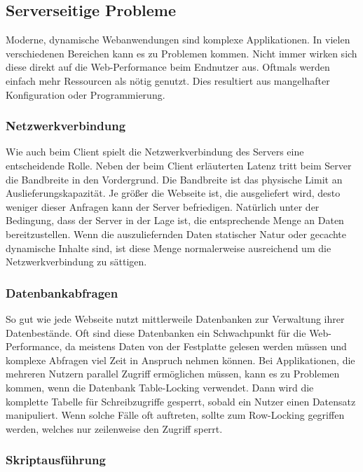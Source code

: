 \subsection{Serverseitige Probleme}
Moderne, dynamische Webanwendungen sind komplexe Applikationen. In vielen verschiedenen Bereichen kann es zu Problemen kommen. Nicht immer wirken sich diese direkt auf die Web-Performance beim Endnutzer aus. Oftmals werden einfach mehr Ressourcen als n\"otig genutzt. Dies resultiert aus mangelhafter Konfiguration oder Programmierung. 

\subsubsection{Netzwerkverbindung}
Wie auch beim Client spielt die Netzwerkverbindung des Servers eine entscheidende Rolle. Neben der beim Client erl\"auterten Latenz tritt beim Server die Bandbreite in den Vordergrund. Die Bandbreite ist das physische Limit an Auslieferungskapazität. Je gr\"o\ss{}er die Webseite ist, die ausgeliefert wird, desto weniger dieser Anfragen kann der Server befriedigen. Nat\"urlich unter der Bedingung, dass der Server in der Lage ist, die entsprechende Menge an Daten bereitzustellen. Wenn die auszuliefernden Daten statischer Natur oder gecachte dynamische Inhalte sind, ist diese Menge normalerweise ausreichend um die Netzwerkverbindung zu s\"attigen. 

  

\subsubsection{Datenbankabfragen}
So gut wie jede Webseite nutzt mittlerweile Datenbanken zur Verwaltung ihrer Datenbestände.
Oft sind diese Datenbanken ein Schwachpunkt für die Web-Performance, da meistens Daten von der Festplatte gelesen werden müssen und komplexe Abfragen viel Zeit in Anspruch nehmen können. Bei Applikationen, die mehreren Nutzern parallel Zugriff erm\"oglichen m\"ussen, kann es zu Problemen kommen, wenn die Datenbank Table-Locking verwendet. Dann wird die komplette Tabelle f\"ur Schreibzugriffe gesperrt, sobald ein Nutzer einen Datensatz manipuliert. Wenn solche F\"alle oft auftreten, sollte zum Row-Locking gegriffen werden, welches nur zeilenweise den Zugriff sperrt.

\subsubsection{Skriptausführung}
